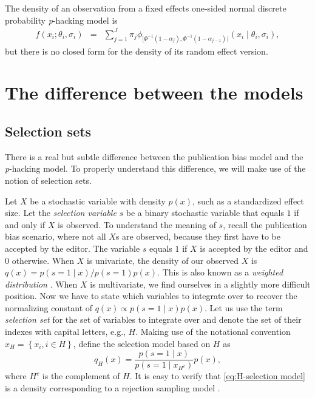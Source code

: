 \documentclass{article}
\theoremstyle{plain}
\theoremstyle{definition}
\begin{document}
The density of an observation from a fixed effects one-sided normal discrete probability \textit{p}-hacking model is
\begin{eqnarray}
f(x_{i};\theta_{i},\sigma_{i}) & = & \sum_{j=1}^{J}\pi_{j}\phi_{[\Phi^{-1}(1-\alpha_{j}),\Phi^{-1}(1-\alpha_{j-1}))}(x_{i}\mid\theta_{i},\sigma_{i}),\label{eq:Fixed effects, p-hacking}
\end{eqnarray}
but there is no closed form for the density of its random effect version.

\section{The difference between the models}\label{sect:differences}

\subsection{Selection sets\label{sec:Selection Sets}}
There is a real but subtle difference between the publication bias model and the \textit{p}-hacking model. To properly understand this difference, we will make use of the notion of selection sets.

Let $X$ be a stochastic variable with density $p(x)$, such as a standardized effect size. Let the \emph{selection variable} $s$ be a binary stochastic variable that equals $1$ if and only if $X$ is observed. To understand the meaning of $s$, recall the publication bias scenario, where not all $X$s are observed, because they first have to be accepted by the editor. The variable $s$ equals $1$ if $X$ is accepted by the editor and $0$ otherwise. When $X$ is univariate, the density of our observed $X$ is $q(x)=p(s=1\mid x)/p(s=1)p(x)$. This is also known as a \emph{weighted distribution} \citep[][eq. 3.1]{rao1985weighted}. When $X$ is multivariate, we find ourselves in a slightly more difficult position. Now we have to state which variables to integrate over to recover the normalizing constant of $q(x)\propto p(s=1\mid x)p(x)$. Let us use the term \emph{selection set} for the set of variables to integrate over and denote the set of their indexes with capital letters, e.g., $H$. Making use of the notational convention $x_{H}=\left\{ x_{i},i\in H\right\}$, define the selection model based on $H$ as
\begin{equation}
q_{H}(x)=\frac{p(s=1\mid x)}{p(s=1\mid x_{H^{c}})}p(x)\label{eq:H-selection model},
\end{equation}
where $H^c$ is the complement of $H$. It is easy to verify that \eqref{eq:H-selection model} is a density corresponding to a rejection sampling model \citep{von1951various}.
\end{document}
